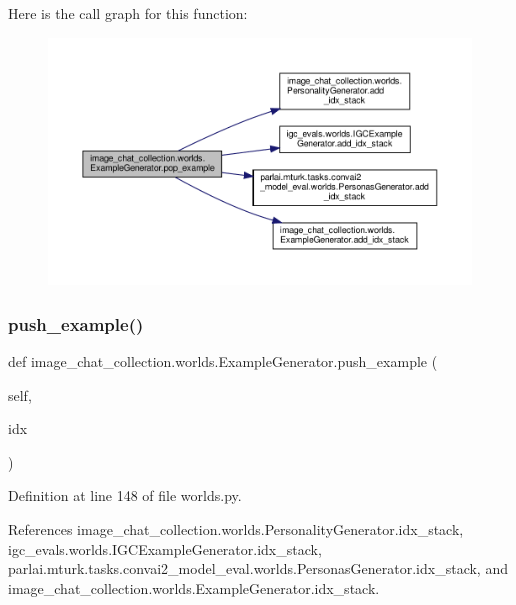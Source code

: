 Here is the call graph for this function\+:
\nopagebreak
\begin{figure}[H]
\begin{center}
\leavevmode
\includegraphics[width=350pt]{classimage__chat__collection_1_1worlds_1_1ExampleGenerator_a483f70c4d3d3643b180f4a37b204f586_cgraph}
\end{center}
\end{figure}
\mbox{\label{classimage__chat__collection_1_1worlds_1_1ExampleGenerator_a417989f9fbc86367d9e4d1a52486db80}} 
\subsubsection{\texorpdfstring{push\+\_\+example()}{push\_example()}}
{\footnotesize\ttfamily def image\+\_\+chat\+\_\+collection.\+worlds.\+Example\+Generator.\+push\+\_\+example (\begin{DoxyParamCaption}\item[{}]{self,  }\item[{}]{idx }\end{DoxyParamCaption})}



Definition at line 148 of file worlds.\+py.



References image\+\_\+chat\+\_\+collection.\+worlds.\+Personality\+Generator.\+idx\+\_\+stack, igc\+\_\+evals.\+worlds.\+I\+G\+C\+Example\+Generator.\+idx\+\_\+stack, parlai.\+mturk.\+tasks.\+convai2\+\_\+model\+\_\+eval.\+worlds.\+Personas\+Generator.\+idx\+\_\+stack, and image\+\_\+chat\+\_\+collection.\+worlds.\+Example\+Generator.\+idx\+\_\+stack.

